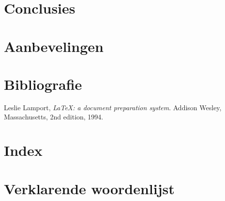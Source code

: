 \documentclass[twoside,openright,parskip]{scrreprt}
\begin{document}
\lipsum

\chapter{Conclusies}

\lipsum

\chapter{Aanbevelingen}

\lipsum

\chapter{Bibliografie}

\begin{thebibliography}{9999}

  Leslie Lamport,
  \emph{\LaTeX: a document preparation system}.
  Addison Wesley, Massachusetts,
  2nd edition,
  1994.

\end{thebibliography}

\chapter{Index}

\lipsum

\chapter{Verklarende woordenlijst}

\printglossaries
\end{document}
